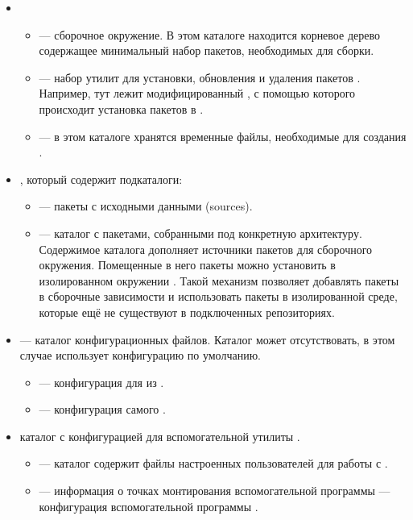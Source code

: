 \begin{itemize}
	\item {}
	\begin{itemize}[$\circ$]
		\item {} --- сборочное окружение. В этом каталоге находится
		корневое дерево содержащее минимальный набор пакетов, необходимых
		для сборки.
		\item {} --- набор утилит для установки, обновления и удаления
		пакетов . Например, тут лежит модифицированный ,
		с помощью которого происходит установка пакетов в .
		\item {} --- в этом каталоге хранятся временные файлы, необходимые для
		создания .
	\end{itemize}
	\item {}, который содержит подкаталоги:
	\begin{itemize}[$\circ$]
		\item {} --- пакеты с исходными данными (sources).
		\item {} --- каталог с пакетами, собранными
		под конкретную архитектуру.
		Содержимое каталога дополняет источники пакетов для сборочного окружения.
		Помещенные в него пакеты можно установить в изолированном окружении .
		Такой механизм позволяет добавлять пакеты в сборочные зависимости и использовать пакеты в
		изолированной среде, которые ещё не существуют в подключенных репозиториях.
	\end{itemize}
	\item {} --- каталог конфигурационных файлов. Каталог может отсутствовать,
	в этом случае  использует конфигурацию по умолчанию.
	\begin{itemize}[$\circ$]
		\item {} --- конфигурация для  из .
		\item {} --- конфигурация самого .
	\end{itemize}
	\item {} каталог с конфигурацией для вспомогательной утилиты .
	\begin{itemize}[$\circ$]
		\item {} --- каталог содержит файлы настроенных пользователей для работы с .
		\item \hypertarget{mount_fs_hasher}{}\label{fstab} --- информация о точках монтирования вспомогательной программы 
		 --- конфигурация вспомогательной программы .
	\end{itemize}
\end{itemize}

